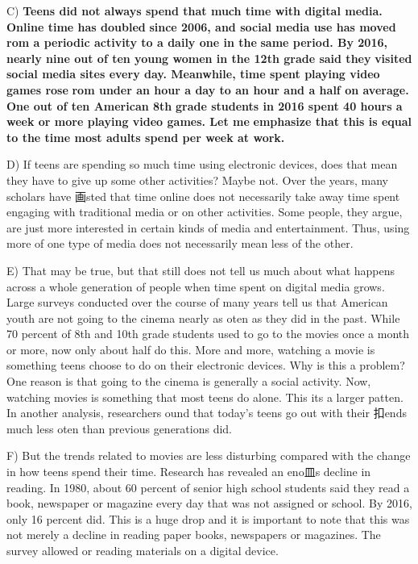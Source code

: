 \documentclass[UTF8,11pt]{ctexart}
\begin{document}
C) \textbf{Teens did not always spend that much time with digital media. Online time has doubled} \textbf{since 2006, and social media use has moved rom a periodic activity to a daily one in the} \textbf{same period. By 2016, nearly nine out of ten young women in the 12th grade said they} \textbf{visited social media sites every day. Meanwhile, time spent playing video games rose} \textbf{rom under an hour a day to an hour and a half on average. One out of ten American 8th} \textbf{grade students in 2016 spent 40 hours a week or more playing video games. Let me} \textbf{emphasize that this is equal to the time most adults spend per week at work.}


D) If teens are spending so much time using electronic devices, does that mean they have to give up some other activities? Maybe not. Over the years, many scholars have 画sted that time online does not necessarily take away time spent engaging with traditional media or on other activities. Some people, they argue, are just more interested in certain kinds of media and entertainment. Thus, using more of one type of media does not necessarily mean less of the other.


E) That may be true, but that still does not tell us much about what happens across a whole generation of people when time spent on digital media grows. Large surveys conducted over the course of many years tell us that American youth are not going to the cinema nearly as oten as they did in the past. While 70 percent of 8th and 10th grade students used to go to the movies once a month or more, now only about half do this. More and more, watching a movie is something teens choose to do on their electronic devices. Why is this a problem? One reason is that going to the cinema is generally a social activity. Now, watching movies is something that most teens do alone. This its a larger patten. In another analysis, researchers ound that today's teens go out with their 扣ends much less oten than previous generations did.


F) But the trends related to movies are less disturbing compared with the change in how teens spend their time. Research has revealed an eno皿s decline in reading. In 1980, about 60 percent of senior high school students said they read a book, newspaper or magazine every day that was not assigned or school. By 2016, only 16 percent did. This is a huge drop and it is important to note that this was not merely a decline in reading paper books, newspapers or magazines. The survey allowed or reading materials on a digital device.
\end{document}
